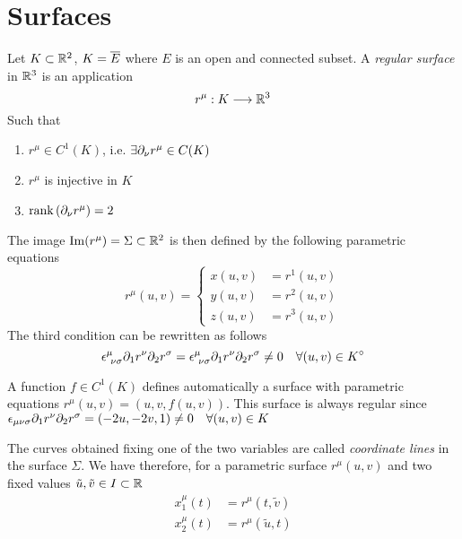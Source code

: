 \documentclass[../complete.tex]{subfiles}
\begin{document}
\section{Surfaces}
\begin{dfn}
	Let $K\subset\mathbb{R}^{2}$, $K=\overline{E}$ where $E$ is an open and connected subset. A \textit{regular surface} in $\mathbb{R}^3$ is an application
	\begin{equation*}
		r^\mu:K\overset{}{\longrightarrow}\mathbb{R}^3
	\end{equation*}
	Such that
	\begin{enumerate}
	\item $r^\mu\in C^1(K)$, i.e. $\exists\partial_\nu r^\mu\in C(K)$
	\item $r^\mu$ is injective in $K$
	\item $\rank\left(\partial_\nu r^\mu\right)=2$
	\end{enumerate}
	The image $\operatorname{Im}(r^\mu)=\Sigma\subset\mathbb{R}^2$ is then defined by the following parametric equations
	\begin{equation}
		r^\mu(u,v)=\left\{\begin{aligned}x(u,v)&=r^1(u,v)\\y(u,v)&=r^2(u,v)\\z(u,v)&=r^3(u,v)\end{aligned}\right.
		\label{eq:parametricsurf}
	\end{equation}
	The third condition can be rewritten as follows
	\begin{equation}
		\epsilon^\mu_{\ \nu\sigma}\del_1r^\nu\del_2r^\sigma=\epsilon^\mu_{\ \nu\sigma}\del_1r^\nu\del_2r^\sigma\ne0\quad\forall(u,v)\in\intr{K}
		\label{eq:surfregcond}
	\end{equation}
\end{dfn}
\begin{rmk}
	A function $f\in C^1(K)$ defines automatically a surface with parametric equations $r^\mu(u,v)=(u,v,f(u,v))$. This surface is always regular since $\epsilon_{\mu\nu\sigma}\partial_1r^\nu\partial_2r^\sigma=(-2u,-2v,1)\ne0\quad\forall(u,v)\in K$
\end{rmk}
\begin{dfn}
	The curves obtained fixing one of the two variables are called \textit{coordinate lines} in the surface $\Sigma$. We have therefore, for a parametric surface $r^\mu(u,v)$ and two fixed values $\tilde{u},\tilde{v}\in I\subset\mathbb{R}$
	\begin{equation}
		\begin{aligned}
			x_1^\mu(t)&=r^\mu(t,\tilde{v})\\
			x_2^\mu(t)&=r^\mu(\tilde{u},t)
		\end{aligned}
		\label{eq:coordinatelines}
	\end{equation}
\end{dfn}
\end{document}
